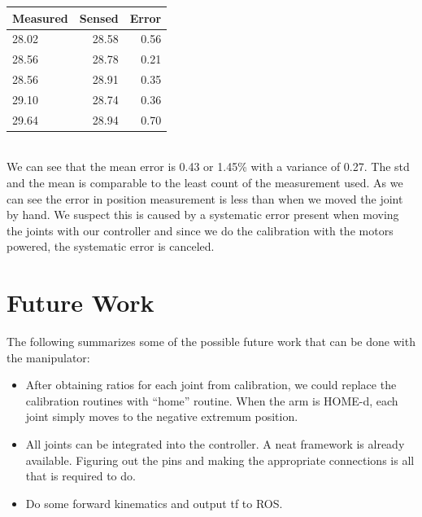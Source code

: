 \documentclass[10pt,a4paper]{article}
\begin{document}
\begin{tabular}{ | l | r | r |}
\hline
\textbf{Measured} & \textbf{Sensed} & \textbf{Error} \\
\hline
 28.02 & 28.58 & 0.56  \\
\hline
 28.56	& 28.78 & 0.21 \\
\hline
 28.56 & 28.91 & 0.35 \\
\hline
 29.10 & 28.74 & 0.36 \\
\hline
 29.64 & 28.94 & 0.70\\
\hline
\end{tabular} \\

We can see that the mean error is 0.43 or 1.45\% with a variance of 0.27. The std and the mean is comparable to the least count of the measurement used.
As we can see the error in position measurement is less than when we moved the joint by hand. We suspect this is caused by a systematic error present when moving the joints with our controller and since we do the calibration with the motors powered, the systematic error is canceled.

\section{Future Work}

The following summarizes some of the possible future work that can be
done with the manipulator: 

\begin{itemize}
\item After obtaining ratios for each joint from calibration, we could
  replace the calibration routines with ``home'' routine. When the arm
  is HOME-d, each joint simply moves to the negative extremum
  position. 
\item All joints can be integrated into the controller. A neat
  framework is already available. Figuring out the pins and making the
  appropriate connections is all that is required to do.
\item Do some forward kinematics and output tf to ROS.
\end{itemize}



\end{document}
